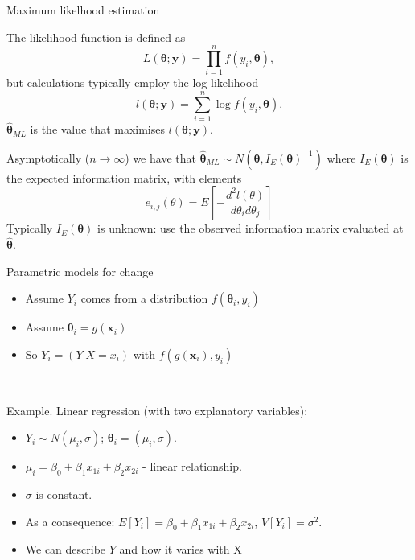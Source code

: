 \documentclass[
  10pt,
  ignorenonframetext,
  compress]{beamer}
\providecommand{\tightlist}{%
  \setlength{\itemsep}{0pt}\setlength{\parskip}{0pt}}
\begin{document}
\begin{frame}{Maximum likelhood estimation}
\protect\hypertarget{maximum-likelhood-estimation}{}

The likelihood function is defined as
\[L(\boldsymbol{\theta}; \boldsymbol{y}) = \prod_{i=1}^{n} f(y_i, \boldsymbol{\theta}), \]
but calculations typically employ the log-likelihood
\[l(\boldsymbol{\theta}; \boldsymbol{y}) = \sum_{i=1}^{n} \log f(y_i, \boldsymbol{\theta}).\]
\(\hat{\boldsymbol{\theta}}_{ML}\) is the value that maximises
\(l(\boldsymbol{\theta}; \boldsymbol{y})\). \pause 

Asymptotically (\(n \rightarrow \infty\)) we have that
\(\hat{\boldsymbol{\theta}}_{ML} \sim N(\boldsymbol{\theta}, I_E(\boldsymbol{\theta})^{-1})\)
where \(I_E(\boldsymbol{\theta})\) is the expected information matrix,
with elements
\[e_{i,j}(\theta) = E\left[ - \frac{d^2 l(\theta)}{d \theta_i d \theta_j} \right] \]
Typically \(I_E(\boldsymbol{\theta})\) is unknown: use the observed
information matrix evaluated at \(\hat{\boldsymbol{\theta}}\).

\end{frame}

\begin{frame}{Parametric models for change}
\protect\hypertarget{parametric-models-for-change}{}

\begin{itemize}
\tightlist
\item
  Assume \(Y_i\) comes from a distribution
  \(f(\boldsymbol{\theta}_i,y_i)\)
\item
  Assume \(\boldsymbol{\theta}_i = g(\boldsymbol{x}_i)\)
\item
  So \(Y_i = (Y|X=x_i)\) with \(f(g(\boldsymbol{x}_i),y_i)\)
\end{itemize}

~

Example. Linear regression (with two explanatory variables):

\begin{itemize}
\tightlist
\item
  \(Y_i \sim N(\mu_i, \sigma)\);
  \(\boldsymbol{\theta}_i = (\mu_i, \sigma)\).
\item
  \(\mu_i = \beta _0 + \beta_1 x_{1i} + \beta_2 x_{2i}\) - linear
  relationship.
\item
  \(\sigma\) is constant.
\item
  As a consequence:
  \(E[Y_i] = \beta _0 + \beta_1 x_{1i} + \beta_2 x_{2i}\),
  \(V[Y_i] = \sigma^2\).
\item
  We can describe \(Y\) and how it varies with X
\end{itemize}

\end{frame}
\end{document}
